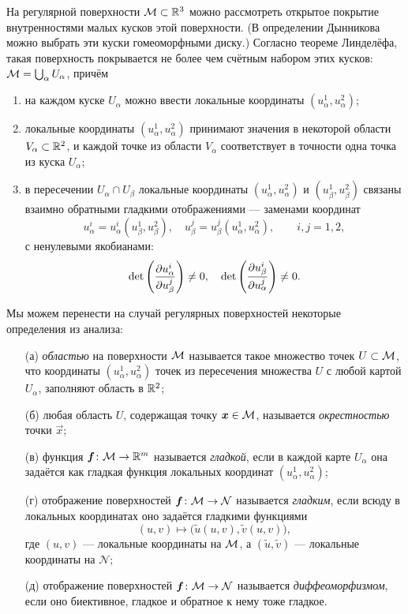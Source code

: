 На регулярной поверхности $\mathcal{M} \subset \mathbb{R}^3$ можно рассмотреть открытое покрытие внутренностями малых кусков этой поверхности. (В определении Дынникова можно выбрать эти куски гомеоморфными диску.) Согласно теореме Линделёфа\footnotemark, такая поверхность покрывается не более чем счётным набором этих кусков: $\mathcal{M} = \bigcup_\alpha U_\alpha$, причём


\begin{enumerate}[nolistsep, label=(\arabic*)]
	\item на каждом куске $U_\alpha$ можно ввести локальные координаты $(u^1_\alpha, u^2_\alpha)$;
	\item локальные координаты $(u^1_\alpha, u^2_\alpha)$ принимают значения в некоторой области $V_\alpha \subset \mathbb{R}^2$, и каждой точке из области $V_\alpha$ соответствует в точности одна точка из куска $U_\alpha$;
	\item в пересечении $U_\alpha \cap U_\beta$ локальные координаты $(u^1_\alpha, u^2_\alpha)$ и $(u^1_\beta, u^2_\beta)$ связаны взаимно обратными гладкими отображениями --- заменами координат
		\[
			u^i_\alpha = u^i_\alpha(u^1_\beta, u^2_\beta),\quad u^j_\beta = u^j_\beta(u^1_\alpha, u^2_\alpha),\qquad i, j = 1, 2,
		\]
		с ненулевыми якобианами:
		\[
			\det\left(\frac{\partial u^i_\alpha}{\partial u^j_\beta}\right) \ne 0,\quad \det\left(\frac{\partial u^i_\beta}{\partial u^j_\alpha}\right) \ne 0.
		\]
\end{enumerate}

Мы можем перенести на случай регулярных поверхностей некоторые определения из анализа:

\begin{enumerate}[nolistsep]
	\item[(а)] \textit{областью} на поверхности $\mathcal{M}$ называется такое множество точек $U \subset \mathcal{M}$, что координаты $(u_\alpha^1, u_\alpha^2)$ точек из пересечения множества $U$ с любой картой $U_\alpha$, заполняют область в $\mathbb{R}^2$;
	\item[(б)] любая область $U$, содержащая точку $\boldsymbol{x} \in \mathcal{M}$, называется \textit{окрестностью} точки $\vec{x}$;
	\item[(в)] функция $\boldsymbol{f}\colon \mathcal{M} \to \mathbb{R}^m$ называется \textit{гладкой}, если в каждой карте $U_\alpha$ она задаётся как гладкая функция локальных координат $(u_\alpha^1, u_\alpha^2)$;
	\item[(г)] отображение поверхностей $\boldsymbol{f}\colon \mathcal{M} \to \mathcal{N}$ называется \textit{гладким}, если всюду в локальных координатах оно задаётся гладкими функциями
		\[
			(u, v) \mapsto \big(\widetilde{u}(u, v), \widetilde{v}(u, v)\big),
		\]
		где $(u, v)$ --- локальные координаты на $\mathcal{M}$, а $(\widetilde{u}, \widetilde{v})$ --- локальные координаты на $\mathcal{N}$;
	\item[(д)] отображение поверхностей $\boldsymbol{f}\colon \mathcal{M} \to \mathcal{N}$ называется \textit{диффеоморфизмом}, если оно биективное, гладкое и обратное к нему тоже гладкое.
\end{enumerate}

